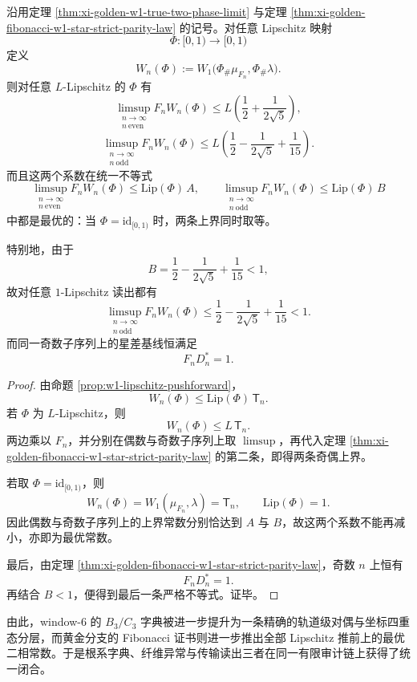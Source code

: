 \begin{theorem}\label{thm:xi-golden-fibonacci-lipschitz-pushforward-sharp}
沿用定理 \ref{thm:xi-golden-w1-true-two-phase-limit} 与定理 \ref{thm:xi-golden-fibonacci-w1-star-strict-parity-law} 的记号。对任意 Lipschitz 映射
\[
\Phi:[0,1)\to[0,1)
\]
定义
\[
W_n(\Phi):=
W_1\bigl(\Phi_\#\mu_{F_n},\Phi_\#\lambda\bigr).
\]
则对任意 \(L\)-Lipschitz 的 \(\Phi\) 有
\[
\limsup_{\substack{n\to\infty\\ n\ \mathrm{even}}}
F_nW_n(\Phi)
\le
L\left(\frac12+\frac{1}{2\sqrt5}\right),
\]
\[
\limsup_{\substack{n\to\infty\\ n\ \mathrm{odd}}}
F_nW_n(\Phi)
\le
L\left(\frac12-\frac{1}{2\sqrt5}+\frac1{15}\right).
\]
而且这两个系数在统一不等式
\[
\limsup_{\substack{n\to\infty\\ n\ \mathrm{even}}}
F_nW_n(\Phi)\le \mathrm{Lip}(\Phi)\,A,
\qquad
\limsup_{\substack{n\to\infty\\ n\ \mathrm{odd}}}
F_nW_n(\Phi)\le \mathrm{Lip}(\Phi)\,B
\]
中都是最优的：当 \(\Phi=\mathrm{id}_{[0,1)}\) 时，两条上界同时取等。

特别地，由于
\[
B=\frac12-\frac{1}{2\sqrt5}+\frac1{15}<1,
\]
故对任意 \(1\)-Lipschitz 读出都有
\[
\limsup_{\substack{n\to\infty\\ n\ \mathrm{odd}}}
F_nW_n(\Phi)
\le
\frac12-\frac{1}{2\sqrt5}+\frac1{15}
<
1.
\]
而同一奇数子序列上的星差基线恒满足
\[
F_nD_n^\ast=1.
\]
\end{theorem}
\begin{proof}
由命题 \ref{prop:w1-lipschitz-pushforward}，
\[
W_n(\Phi)\le \mathrm{Lip}(\Phi)\,\mathsf T_n.
\]
若 \(\Phi\) 为 \(L\)-Lipschitz，则
\[
W_n(\Phi)\le L\,\mathsf T_n.
\]
两边乘以 \(F_n\)，并分别在偶数与奇数子序列上取 \(\limsup\)，再代入定理 \ref{thm:xi-golden-fibonacci-w1-star-strict-parity-law} 的第二条，即得两条奇偶上界。

若取 \(\Phi=\mathrm{id}_{[0,1)}\)，则
\[
W_n(\Phi)=W_1(\mu_{F_n},\lambda)=\mathsf T_n,
\qquad
\mathrm{Lip}(\Phi)=1.
\]
因此偶数与奇数子序列上的上界常数分别恰达到 \(A\) 与 \(B\)，故这两个系数不能再减小，亦即为最优常数。

最后，由定理 \ref{thm:xi-golden-fibonacci-w1-star-strict-parity-law}，奇数 \(n\) 上恒有
\[
F_nD_n^\ast=1.
\]
再结合 \(B<1\)，便得到最后一条严格不等式。证毕。
\end{proof}

\noindent
由此，window-\(6\) 的 \(B_3/C_3\) 字典被进一步提升为一条精确的轨道级对偶与坐标四重态分层，而黄金分支的 Fibonacci 证书则进一步推出全部 Lipschitz 推前上的最优二相常数。于是根系字典、纤维异常与传输读出三者在同一有限审计链上获得了统一闭合。

\endinput
